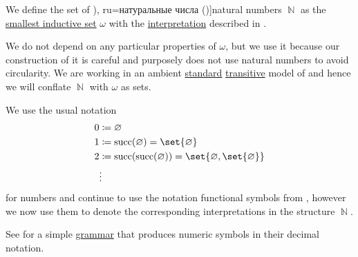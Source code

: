 \begin{definition}\label{def:natural_numbers}
  We define the set of \term[bg=естествени числа (\cite[371]{ГеновМиховскиМоллов1991}), ru=натуральные числа (\cite[aux I.4.1]{КолмогоровДрагалин2006})]{natural numbers} \( \BbbN \) as the \hyperref[thm:smallest_inductive_set_existence]{smallest inductive set} \( \omega \) with the \hyperref[def:first_order_structure/interpretation]{interpretation} described in .

  We do not depend on any particular properties of \( \omega \), but we use it because our construction of it is careful and purposely does not use natural numbers to avoid circularity. We are working in an ambient \hyperref[rem:standard_model_of_set_theory]{standard} \hyperref[rem:transitive_model_of_set_theory]{transitive} model of \hyperref[def:axiom_of_universes]{} and hence we will conflate \( \BbbN \) with \( \omega \) as sets.

  We use the usual notation
  \begin{align*}
    0 &\coloneqq \varnothing \\
    1 &\coloneqq \op{succ}(\varnothing) = \set{ \varnothing } \\
    2 &\coloneqq \op{succ}(\op{succ}(\varnothing)) = \set{ \varnothing, \set{ \varnothing } } \\
      &\vdots
  \end{align*}
  for numbers and continue to use the notation functional symbols from , however we now use them to denote the corresponding interpretations in the structure \( \BbbN \).
\end{definition}
\begin{comments}
  \item See  for a simple \hyperref[def:formal_grammar]{grammar} that produces numeric symbols in their decimal notation.
\end{comments}

